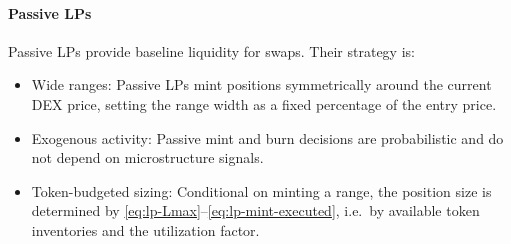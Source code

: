\documentclass[11pt]{article}
\begin{document}
\paragraph{Passive LPs}
Passive LPs provide baseline liquidity for swaps. Their strategy is:
\begin{itemize}[leftmargin=*]
  \item Wide ranges: Passive LPs mint positions symmetrically around the current DEX price, setting the range width as a fixed percentage of the entry price.
  \item Exogenous activity: Passive mint and burn decisions are probabilistic and do not depend on
  microstructure signals.
  \item Token-budgeted sizing: Conditional on minting a range, the position size is determined by
  \eqref{eq:lp-Lmax}--\eqref{eq:lp-mint-executed}, i.e.\ by available token inventories and the utilization
  factor.
\end{itemize}
\end{document}
